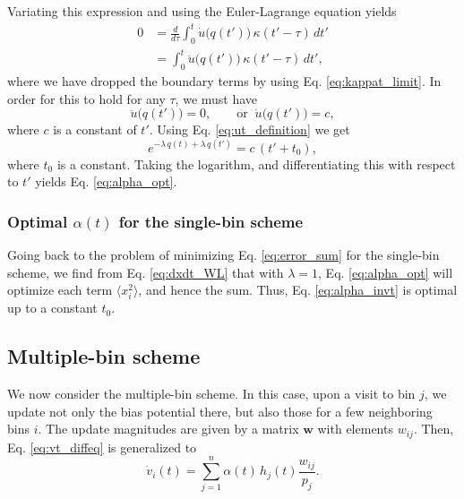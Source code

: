 \documentclass[reprint]{revtex4-1}
\begin{document}
Variating this expression and
using the Euler-Lagrange equation yields
$$
\begin{aligned}
0
&=
\frac{d}{d\tau} \int_0^t
  \dot u\bigl( q(t') \bigr) \, \kappa(t' - \tau) \, dt'
\\
&= \int_0^t
  \ddot u\bigl( q(t') \bigr) \, \kappa(t' - \tau) \, dt',
\end{aligned}
$$
where we have dropped the boundary terms
by using Eq. \eqref{eq:kappat_limit}.
%
%
In order for this to hold for any $\tau$,
we must have
%
\begin{equation}
\ddot u\bigl( q(t') \bigr) = 0,
\qquad
\mathrm{or}
\;\;
\dot u\bigl( q(t') \bigr) = c,
\label{eq:ddu_eq_0}
\end{equation}
%
where $c$ is a constant of $t'$.
%
Using Eq. \eqref{eq:ut_definition}
we get
$$
e^{-\lambda \, q(t) + \lambda \, q(t')}
=
c \, (t' + t_0),
$$
where $t_0$ is a constant.
%
Taking the logarithm, and differentiating this with respect to $t'$
yields Eq. \eqref{eq:alpha_opt}.



\subsubsection{Optimal $\alpha(t)$ for the single-bin scheme}



Going back to the problem of
minimizing Eq. \eqref{eq:error_sum}
for the single-bin scheme,
we find from Eq. \eqref{eq:dxdt_WL}
that with $\lambda = 1$,
Eq. \eqref{eq:alpha_opt}
will optimize each term $\langle x_i^2 \rangle$,
and hence the sum.
%
Thus, Eq. \eqref{eq:alpha_invt} is optimal
up to a constant $t_0$. %



\subsection{\label{sec:multiple-bin}
Multiple-bin scheme}



We now consider the multiple-bin scheme.
%
In this case,
upon a visit to bin $j$,
we update not only the bias potential there,
but also those for a few neighboring bins $i$.
%
The update magnitudes are given by a matrix $\mathbf w$
with elements $w_{ij}$.
%
Then, Eq. \eqref{eq:vt_diffeq} is generalized to
\begin{equation}
  \dot v_i(t) =
  \sum_{j=1}^n \alpha(t) \, h_j(t) \frac{ w_{ij} } { p_j }.
  \label{eq:vt_diffeq_mbin}
\end{equation}
\end{document}
